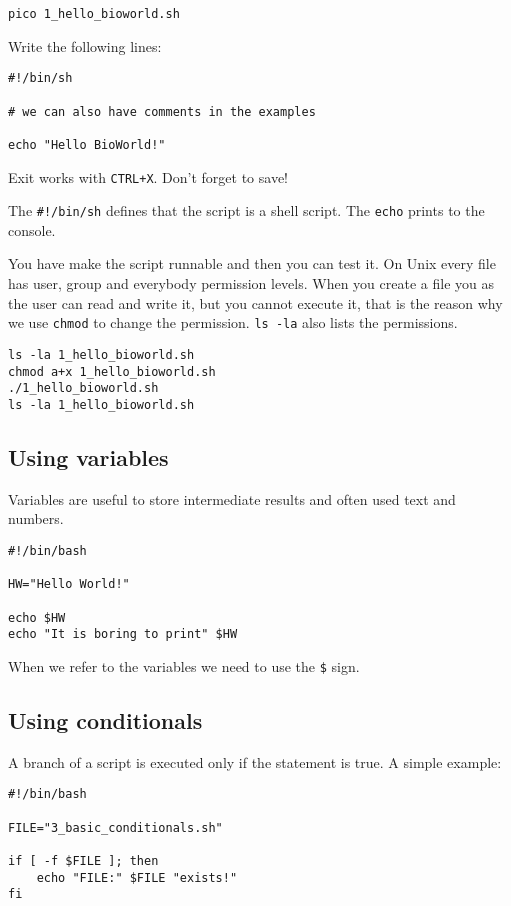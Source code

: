 \documentclass{article}\usepackage[]{graphicx}\usepackage[usenames,dvipsnames]{color}
\begin{document}
\begin{verbatim}
pico 1_hello_bioworld.sh
\end{verbatim}

Write the following lines:

\begin{verbatim}
#!/bin/sh

# we can also have comments in the examples

echo "Hello BioWorld!"
\end{verbatim}

Exit works with \verb!CTRL+X!. Don't forget to save!

The \verb+#!/bin/sh+ defines that the script is a shell script. The \verb+echo+ prints to the console.

You have make the script runnable and then you can test it. On Unix every file has user, group and everybody permission levels. When you create a file you as the user can read and write it, but you cannot execute it, that is the reason why we use \verb+chmod+ to change the permission. \verb+ls -la+ also lists the permissions.

\begin{verbatim}
ls -la 1_hello_bioworld.sh
chmod a+x 1_hello_bioworld.sh
./1_hello_bioworld.sh
ls -la 1_hello_bioworld.sh
\end{verbatim}

\subsection*{Using variables}

Variables are useful to store intermediate results and often used text and numbers. 

\begin{verbatim}
#!/bin/bash

HW="Hello World!"

echo $HW
echo "It is boring to print" $HW
\end{verbatim}

When we refer to the variables we need to use the \verb+$+ sign.

\subsection*{Using conditionals}

A branch of a script is executed only if the statement is true. A simple example:

\begin{verbatim}
#!/bin/bash

FILE="3_basic_conditionals.sh"

if [ -f $FILE ]; then
    echo "FILE:" $FILE "exists!"
fi
\end{verbatim}
\end{document}
